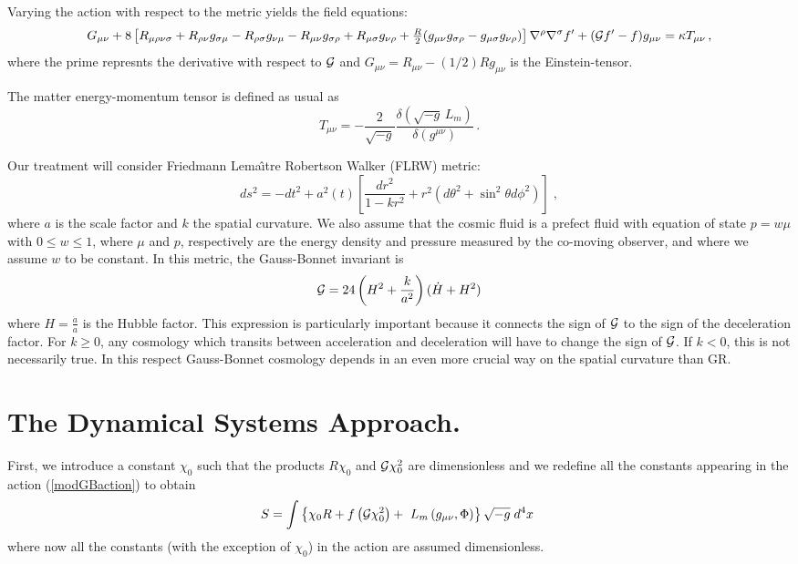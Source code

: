 \documentclass[a4paper,aps,onecolumn,nofootinbib]{revtex4}
\def\rf#1{(\ref{#1})}
\def\G{{\cal G}}
\begin{document}
Varying the action with respect to the metric yields the field equations:
%
\begin{eqnarray}
\label{geeq}
G_{\mu \nu}+8 \left[ R_{\mu \rho \nu \sigma} +R_{\rho \nu} g_{\sigma \mu}
-R_{\rho \sigma} g_{\nu \mu} -R_{\mu \nu} g_{\sigma \rho}+
R_{\mu \sigma} g_{\nu \rho}+\tfrac{R}{2} (g_{\mu \nu} g_{\sigma \rho}
-g_{\mu \sigma} g_{\nu \rho}) \right] \nabla^{\rho} \nabla^{\sigma} f'
+(\G f'-f) g_{\mu \nu}=\kappa T_{\mu \nu}\,,
\end{eqnarray}
%
where the prime represnts the derivative with respect to $\G$ and $G_{\mu \nu}=R_{\mu \nu}-(1/2)R g_{\mu \nu}$ is the Einstein-tensor.  

The matter energy-momentum tensor is defined as usual as
\begin{equation}
T_{\mu \nu }=-\frac{2}{\sqrt{-g}}\frac{\delta (\sqrt{-g}\,{L}_{m})}{\delta
(g^{\mu \nu })} \,.  \label{EMTdef2}
\end{equation}

Our treatment will consider  Friedmann Lema\^{\i}tre Robertson Walker (FLRW) metric:
\begin{equation}\label{frw}
 ds^2 = -dt^2 + a^2(t)\left[ \frac{dr^2}{1-kr^2} + r^2 (d\theta^2 +
\sin^2\theta d\phi^2)\right]\;,
\end{equation}
where $a$ is the scale factor and  $k$ the spatial curvature. We also assume that the cosmic fluid is a prefect fluid 
with equation of state $p=w \mu$  with $0\leq w\leq1$, where $\mu$ and  $p$, respectively are the energy density and pressure measured by the co-moving observer, and where we assume   $w$ to be constant. In this metric, the Gauss-Bonnet invariant is 
\begin{equation}
\G=24\left(H^2+\frac{k}{a^2}\right)(\dot{H}+H^2)
\end{equation}
where $H=\frac{\dot{a}}{a}$ is the Hubble factor. This expression is particularly important because it connects the sign of $\G$ to the sign of the deceleration factor. For $k\geq0$, any cosmology which transits between acceleration and deceleration will have to change the sign of $\G$. If $k<0$, this is not necessarily true. In this respect Gauss-Bonnet cosmology depends in an even more crucial way on the spatial curvature than GR.

\section{The Dynamical Systems Approach.}
First, we introduce a  constant $\chi_0$ such that the products $R\chi_0$ and ${\cal G}\chi_0^2$ are dimensionless and we  redefine all the constants appearing in the action \rf{modGBaction} to obtain
\begin{equation}\label{action}
S=\int \left\{\chi_0 R+ f\left({\cal G} \chi_0^2\right)+{\ L}%
_{m}\left(g_{\mu \nu},\Phi\right)\right\} \sqrt{-g}\;d^{4}x~
\end{equation}%
where now all the constants (with the exception of $\chi_0$) in the action are assumed dimensionless.
\end{document}
